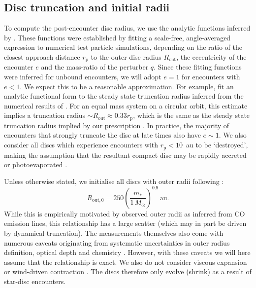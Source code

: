 \documentclass{aa}
\begin{document}
\subsection{Disc truncation and initial radii}
\label{sec:rtrunc}

To compute the post-encounter disc radius, we use the analytic functions inferred by \citet{Winter18b}. These functions were established by fitting a scale-free, angle-averaged expression to numerical test particle simulations, depending on the ratio of the closest approach distance $r_\mathrm{p}$ to the outer disc radius $R_\mathrm{out}$, the eccentricity of the encounter $e$ and the mass-ratio of the perturber $q$. Since these fitting functions were inferred for unbound encounters, we will adopt $e=1$ for encounters with $e<1$. We expect this to be a reasonable approximation. For example, \citet{Manara19} fit an analytic functional form to the steady state truncation radius inferred from the numerical results of \citet{Artymowicz94}. For an equal mass system on a circular orbit, this estimate implies a truncation radius $\sim R_\mathrm{out} \approx 0.33 r_\mathrm{p}$, which is the same as the steady state truncation radius implied by our prescription \citep[see Figure 4 of][]{Winter18b}. In practice, the majority of encounters that strongly truncate the disc at late times also have $e\sim 1$. We also consider all discs which experience encounters with $r_\mathrm{p}< 10$~au to be `destroyed', making the assumption that the resultant compact disc may be rapidly accreted or photoevaporated \citep[e.g.][]{Clarke01}. 

Unless otherwise stated, we initialise all discs with
outer radii following \citep{Andrews20}:
\begin{equation}
\label{eq:mass_radius_relation}
    R_{\mathrm{out},0} = 250 \left( \frac{m_*}{1\, M_\odot} \right)^{0.9} \, \mathrm{au}.
\end{equation}While this is empirically motivated by observed outer radii as inferred from CO emission lines, this relationship has a large scatter (which may in part be driven by dynamical truncation). The measurements themselves also come with numerous caveats originating from systematic uncertainties in outer radius definition, optical depth and chemistry \citep[see e.g.][]{Miotello23}. However, with these caveats we will here assume that the relationship is exact. We also do not consider viscous expansion \citep[e.g.][]{Lyn74} or wind-driven contraction \citep[e.g.][]{Tabone22}. The discs therefore only evolve (shrink) as a result of star-disc encounters. 
\end{document}
